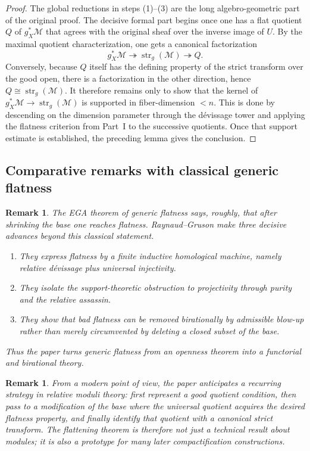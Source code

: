 \documentclass[11pt,oneside]{article}
\newtheorem{remark}[theorem]{Remark}
\newcommand{\M}{\mathcal M}
\newcommand{\st}{\operatorname{str}}
\begin{document}
\begin{proof}
The global reductions in steps (1)--(3) are the long algebro-geometric part of the original proof.  The decisive formal part begins once one has a flat quotient $Q$ of $g_X^*\M$ that agrees with the original sheaf over the inverse image of $U$.  By the maximal quotient characterization, one gets a canonical factorization
\[
g_X^*\M\twoheadrightarrow \st_g(\M)\twoheadrightarrow Q.
\]
Conversely, because $Q$ itself has the defining property of the strict transform over the good open, there is a factorization in the other direction, hence $Q\cong \st_g(\M)$.  It therefore remains only to show that the kernel of $g_X^*\M\to \st_g(\M)$ is supported in fiber-dimension $<n$.  This is done by descending on the dimension parameter through the d\'evissage tower and applying the flatness criterion from Part~I to the successive quotients.  Once that support estimate is established, the preceding lemma gives the conclusion.
\end{proof}

\subsection{Comparative remarks with classical generic flatness}

\begin{remark}
The EGA theorem of generic flatness says, roughly, that after shrinking the base one reaches flatness.  Raynaud--Gruson make three decisive advances beyond this classical statement.
\begin{enumerate}[label=\textup{(\roman*)}]
  \item They express flatness by a finite inductive homological machine, namely relative d\'evissage plus universal injectivity.
  \item They isolate the support-theoretic obstruction to projectivity through purity and the relative assassin.
  \item They show that bad flatness can be removed birationally by admissible blow-up rather than merely circumvented by deleting a closed subset of the base.
\end{enumerate}
Thus the paper turns generic flatness from an openness theorem into a functorial and birational theory.
\end{remark}

\begin{remark}
From a modern point of view, the paper anticipates a recurring strategy in relative moduli theory: first represent a good quotient condition, then pass to a modification of the base where the universal quotient acquires the desired flatness property, and finally identify that quotient with a canonical strict transform.  The flattening theorem is therefore not just a technical result about modules; it is also a prototype for many later compactification constructions.
\end{remark}
\end{document}
